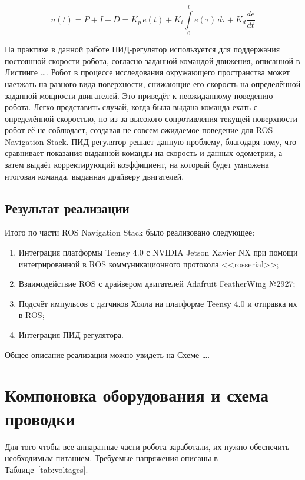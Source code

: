 \begin{equation}
    \label{eq:pid}
    u(t)=P+I+D=K_{p}\,{e(t)}+K_{i}\int \limits _{0}^{t}{e(\tau )}\,{d\tau }+K_{d}{\frac {de}{dt}}
\end{equation}

На практике в данной работе ПИД-регулятор используется для поддержания постоянной скорости робота, согласно заданной командой движения, описанной в Листинге \ldots. Робот в процессе исследования окружающего пространства может наезжать на разного вида поверхности, снижающие его скорость на определённой заданной мощности двигателей. Это приведёт к неожиданному поведению робота. Легко представить случай, когда была выдана команда ехать с определённой скоростью, но из-за высокого сопротивления текущей поверхности робот её не соблюдает, создавая не совсем ожидаемое поведение для ROS Navigation Stack. ПИД-регулятор решает данную проблему, благодаря тому, что сравнивает показания выданной команды на скорость и данных одометрии, а затем выдаёт корректирующий коэффициент, на который будет умножена итоговая команда, выданная драйверу двигателей.

\subsection{Результат реализации}

Итого по части ROS Navigation Stack было реализовано следующее:
\begin{enumerate}[beginpenalty=10000] %
  \item Интеграция платформы Teensy 4.0 с NVIDIA Jetson Xavier NX при помощи интегрированной в ROS коммуникационного протокола <<rosserial>>;
  \item Взаимодействие ROS с драйвером двигателей Adafruit FeatherWing №2927;
  \item Подсчёт импульсов с датчиков Холла на платформе Teensy 4.0 и отправка их в ROS;
  \item Интеграция ПИД-регулятора. 
\end{enumerate}

Общее описание реализации можно увидеть на Схеме \ldots.

\section{Компоновка оборудования и схема проводки}

Для того чтобы все аппаратные части робота заработали, их нужно обеспечить необходимым питанием. Требуемые напряжения описаны в Таблице~\cref{tab:voltages}.

